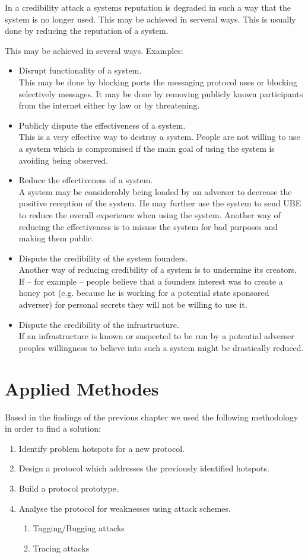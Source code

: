 In a credibility attack a systems reputation is degraded in such a way that the system is no longer used. This may be achieved in serveral ways. This is usually done by reducing the reputation of a system.

This may be achieved in several ways. Examples:
\begin{itemize}
	\item Disrupt functionality of a system.\\ 
	This may be done by blocking ports the messaging protocol uses or blocking selectively messages. It may be done by removing publicly known participants from the internet either by law or by threatening.
	\item Publicly dispute the effectiveness of a system.\\
	This is a very effective way to destroy a system. People are not willing to use a system which is compromised if the main goal of using the system is avoiding being observed.
	\item Reduce the effectiveness of a system.\\
	A system may be considerably being loaded by an adverser to decrease the positive reception of the system. He may further use the system to send UBE to reduce the overall experience when using the system. Another way of reducing the effectiveness is to misuse the system for bad purposes and making them public.
	\item Dispute the credibility of the system founders.\\
	Another way of reducing credibility of a system is to undermine its creators. If -- for example -- people believe that a founders interest was to create a honey pot (e.g. because he is working for a potential state sponsored adverser) for personal secrets they will not be willing to use it.
	\item Dispute the credibility of the infrastructure.\\
	If an infrastructure is known or suspected to be run by a potential adverser peoples willingness to believe into such a system might be drastically reduced.
\end{itemize}

\chapter{Applied Methodes}
Based in the findings of the previous chapter we used the following methodology in order to find a solution:
\begin{enumerate}
	\item Identify problem hotspots for a new protocol.
	\item Design a protocol which addresses the previously identified hotspots.
	\item Build a protocol prototype.
	\item Analyse the protocol for weaknesses using attack schemes.
	\begin{enumerate}
		\item Tagging/Bugging attacks
		\item Tracing attacks
	\end{enumerate}
\end{enumerate}

